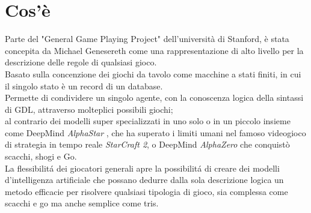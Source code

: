 \section{Cos'è} %
Parte del "General Game Playing Project" dell'università di Stanford,
è stata concepita da Michael Genesereth come una rappresentazione di alto livello per 
la descrizione delle regole di qualsiasi gioco. \\
Basato sulla concenzione dei giochi da tavolo come macchine a stati finiti, in cui il singolo stato
è un record di un database. \\
Permette di condividere un singolo agente, con la conoscenza logica della sintassi di GDL,
attraverso molteplici possibili giochi; \\ 
al contrario dei modelli super specializzati in uno solo o 
in un piccolo insieme come DeepMind \textit{AlphaStar} \cite{AlphaStar},
che ha superato i limiti umani nel famoso videogioco di strategia in tempo reale \textit{StarCraft 2},
o DeepMind \textit{AlphaZero} \cite{AlphaZero} che conquistò scacchi, shogi e Go. \\
La flessibilitá dei giocatori generali apre la possibilitá di creare dei modelli d'intelligenza artificiale 
che possano dedurre dalla sola descrizione logica un metodo efficacie per risolvere qualsiasi tipologia di gioco,
sia complessa come scacchi e go ma anche semplice come tris.  

